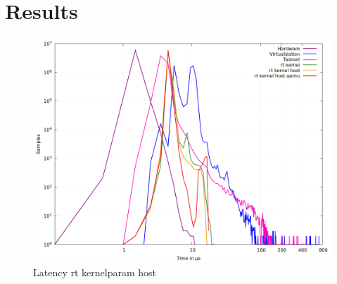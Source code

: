 \documentclass[MMR,Master,english]{twbook}
\begin{document}

\chapter{Results}\label{cha:results}
\begin{figure}[H]
	\centering
	\includegraphics[width=0.7\columnwidth]{masterthesis-documentation/docs/sigmatek/xenomai/012456combined/gnuplot_combined_max_latency.png}
	\caption[Latency rt kernelparam host]{Latency rt kernelparam host}
	\label{fig:max_latency_rt_kernelparam_host}
\end{figure}
\end{document}
